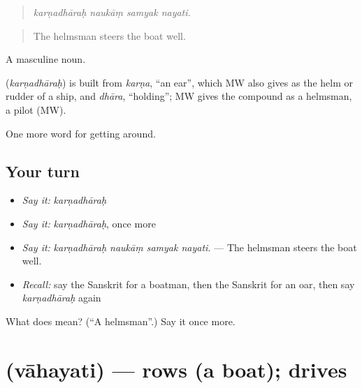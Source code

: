 \begin{quote}
   
\end{quote}

\begin{quote}
\emph{karṇadhāraḥ naukāṃ samyak nayati.}
\end{quote}

\begin{quote}
The helmsman steers the boat well.
\end{quote}

A masculine noun.

\begin{cousinweb}
\textbf{} (\emph{karṇadhāraḥ}) is built from \emph{karṇa}, \textquotedblleft{}an ear\textquotedblright{}, which MW also gives as the helm or rudder of a ship, and \emph{dhāra}, \textquotedblleft{}holding\textquotedblright{}; MW gives the compound as a helmsman, a pilot (MW).
\end{cousinweb}

\begin{grammarlens}[title={What you've built}]
One more word for getting around.
\end{grammarlens}

\subsection*{Your turn}
\begin{itemize}
\raggedright
  \item \emph{Say it:} \emph{karṇadhāraḥ}
  \item \emph{Say it:} \emph{karṇadhāraḥ}, once more
  \item \emph{Say it:} \emph{karṇadhāraḥ naukāṃ samyak nayati.} — The helmsman steers the boat well.
  \item \emph{Recall:} say the Sanskrit for a boatman, then the Sanskrit for an oar, then say \emph{karṇadhāraḥ} again
\end{itemize}

\begin{tcolorbox}[breakable,colback=teal!4,colframe=teal!35!black,title={Before you move on}]
What does  mean? (\textquotedblleft{}A helmsman\textquotedblright{}.) Say it once more.
\end{tcolorbox}
\section[\texorpdfstring{\sk{वाहयति} (vāhayati)}{वाहयति (vāhayati)}]{ (vāhayati) — rows (a boat); drives}


